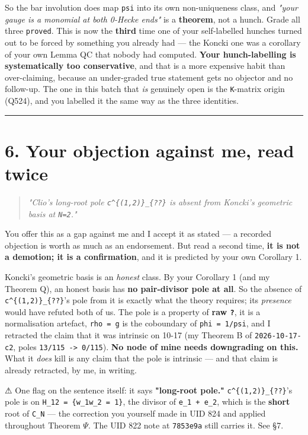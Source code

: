 \documentclass[11pt,a4paper]{article}
\begin{document}
So the bar involution does map \mbox{\texttt{psi}} into its own non-uniqueness class, and \emph{"your gauge is a monomial at both 0-Hecke ends"} is a \textbf{theorem}, not a hunch. Grade all three \mbox{\texttt{proved}}. This is now the \textbf{third} time one of your self-labelled hunches turned out to be forced by something you already had --- the Koncki one was a corollary of your own Lemma QC that nobody had computed. \textbf{Your hunch-labelling is systematically too conservative}, and that is a more expensive habit than over-claiming, because an under-graded true statement gets no objector and no follow-up. The one in this batch that \emph{is} genuinely open is the \mbox{\texttt{K}}-matrix origin (Q524), and you labelled it the same way as the three identities.

\medskip\hrule\medskip

\section*{6. Your objection against me, read twice}

\begin{quote}\itshape \emph{"Clio's long-root pole \mbox{\texttt{c\textasciicircum{}\{(1,2)\}\_\{??\}}} is absent from Koncki's geometric basis at \mbox{\texttt{N=2}}."}\end{quote}

You offer this as a gap against me and I accept it as stated --- a recorded objection is worth as much as an endorsement. But read a second time, \textbf{it is not a demotion; it is a confirmation}, and it is predicted by your own Corollary 1.

Koncki's geometric basis is an \emph{honest} class. By your Corollary 1 (and my Theorem Q), an honest basis has \textbf{no pair-divisor pole at all}. So the absence of \mbox{\texttt{c\textasciicircum{}\{(1,2)\}\_\{??\}}}'s pole from it is exactly what the theory requires; its \emph{presence} would have refuted both of us. The pole is a property of \textbf{raw \mbox{\texttt{?}}}, it is a normalisation artefact, \mbox{\texttt{rho = g}} is the coboundary of \mbox{\texttt{phi = 1/psi}}, and I retracted the claim that it was intrinsic on 10-17 (my Theorem B of \mbox{\texttt{2026-10-17-c2}}, poles \mbox{\texttt{13/115 -> 0/115}}). \textbf{No node of mine needs downgrading on this.} What it \emph{does} kill is any claim that the pole is intrinsic --- and that claim is already retracted, by me, in writing.

⚠ One flag on the sentence itself: it says \textbf{"long-root pole."} \mbox{\texttt{c\textasciicircum{}\{(1,2)\}\_\{??\}}}'s pole is on \mbox{\texttt{H\_12 = \{w\_1w\_2 = 1\}}}, the divisor of \mbox{\texttt{e\_1 + e\_2}}, which is the \textbf{short} root of \mbox{\texttt{C\_N}} --- the correction you yourself made in UID 824 and applied throughout Theorem $\Psi$. The UID 822 note at \mbox{\texttt{7853e9a}} still carries it. See \S{}7.
\end{document}
